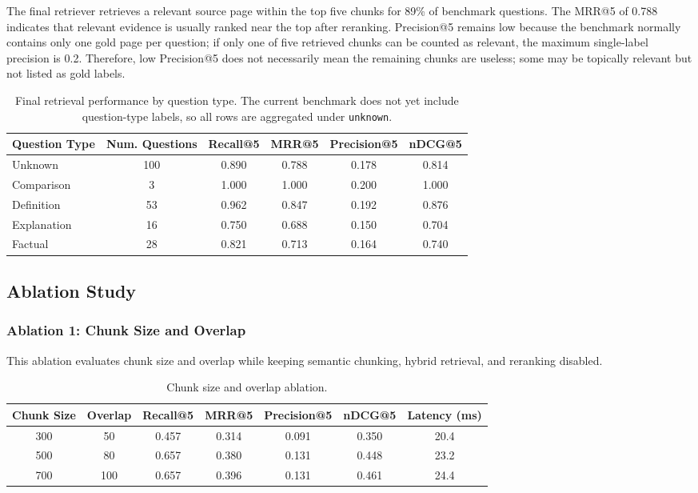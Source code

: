 \documentclass[11pt,a4paper]{article}
\begin{document}
The final retriever retrieves a relevant source page within the top five chunks
for 89\% of benchmark questions. The MRR@5 of 0.788 indicates that relevant
evidence is usually ranked near the top after reranking. Precision@5 remains
low because the benchmark normally contains only one gold page per question; if
only one of five retrieved chunks can be counted as relevant, the maximum
single-label precision is 0.2. Therefore, low Precision@5 does not necessarily
mean the remaining chunks are useless; some may be topically relevant but not
listed as gold labels.

\begin{table}[H]
\centering
\caption{Final retrieval performance by question type. The current benchmark
does not yet include question-type labels, so all rows are aggregated under
\texttt{unknown}.}
\label{tab:by-type}
\begin{tabular}{lccccc}
\toprule
Question Type & Num. Questions & Recall@5 & MRR@5 & Precision@5 & nDCG@5 \\
\midrule
Unknown & 100 & 0.890 & 0.788 & 0.178 & 0.814 \\
Comparison  & 3  & 1.000 & 1.000 & 0.200 & 1.000 \\
Definition  & 53 & 0.962 & 0.847 & 0.192 & 0.876 \\
Explanation & 16 & 0.750 & 0.688 & 0.150 & 0.704 \\
Factual     & 28 & 0.821 & 0.713 & 0.164 & 0.740 \\
\bottomrule
\end{tabular}
\end{table}

\subsection{Ablation Study}

\subsubsection{Ablation 1: Chunk Size and Overlap}

This ablation evaluates chunk size and overlap while keeping semantic chunking,
hybrid retrieval, and reranking disabled.
{\small
\begin{table}[H]
\centering
\caption{Chunk size and overlap ablation.}
\label{tab:chunk-size}
\begin{tabular}{ccccccc}
\toprule
Chunk Size & Overlap & Recall@5 & MRR@5 & Precision@5 & nDCG@5 & Latency (ms) \\
\midrule
300  & 50  & 0.457 & 0.314 & 0.091 & 0.350 & 20.4 \\
500  & 80  & 0.657 & 0.380 & 0.131 & 0.448 & 23.2 \\
700  & 100 & 0.657 & 0.396 & 0.131 & 0.461 & 24.4 \\
\bottomrule
\end{tabular}
\end{table}
}
\end{document}
